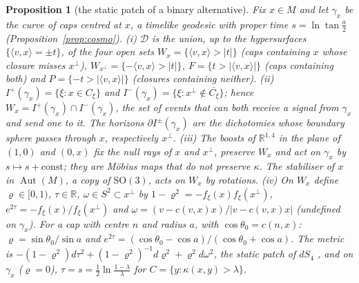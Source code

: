 \documentclass[aps,pra,onecolumn,superscriptaddress,nofootinbib,10pt]{revtex4-2}
\newtheorem{proposition}[theorem]{Proposition}
\theoremstyle{definition}
\theoremstyle{remark}
\newcommand{\R}{\mathbb{R}}
\newcommand{\cD}{\mathcal{D}}
\newcommand{\Aut}{\operatorname{Aut}}
\newcommand{\ip}[2]{\langle #1,#2\rangle}
\newcommand{\SO}{\mathrm{SO}}
\begin{document}
\begin{proposition}[the static patch of a binary alternative]\label{prop:static}
Fix $x\in M$ and let $\gamma_x$ be the curve of caps centred at $x$, a timelike geodesic with proper time
$s=\ln\tan\frac a2$ (Proposition~\ref{prop:cosmo}).
(i) $\cD$ is the union, up to the hypersurfaces $\{\ip vx=\pm t\}$, of the four open sets
$W_x=\{\ip vx>\lvert t\rvert\}$ (caps containing $x$ whose closure misses $x^\perp$),
$W_{x^\perp}=\{-\ip vx>\lvert t\rvert\}$, $F=\{t>\lvert\ip vx\rvert\}$ (caps containing both) and
$P=\{-t>\lvert\ip vx\rvert\}$ (closures containing neither).
(ii) $I^+(\gamma_x)=\{\xi:x\in C_\xi\}$ and $I^-(\gamma_x)=\{\xi:x^\perp\notin\overline{C_\xi}\}$; hence
$W_x=I^+(\gamma_x)\cap I^-(\gamma_x)$, the set of events that can both receive a signal from $\gamma_x$ and
send one to it.  The horizons $\partial I^\pm(\gamma_x)$ are the dichotomies whose boundary sphere passes
through $x$, respectively $x^\perp$.
(iii) The boosts of $\R^{1,4}$ in the plane of $(1,0)$ and $(0,x)$ fix the null rays of $x$ and $x^\perp$,
preserve $W_x$ and act on $\gamma_x$ by $s\mapsto s+\mathrm{const}$; they are M\"obius maps that do not
preserve $\kappa$.  The stabiliser of $x$ in $\Aut(M)$, a copy of $\SO(3)$, acts on $W_x$ by rotations.
(iv) On $W_x$ define $\varrho\in[0,1)$, $\tau\in\R$, $\omega\in S^2\subset x^\perp$ by
$1-\varrho^2=-f_\xi(x)f_\xi(x^\perp)$, $e^{2\tau}=-f_\xi(x)/f_\xi(x^\perp)$ and
$\omega=(v-c(v,x)x)/\lvert v-c(v,x)x\rvert$ (undefined on $\gamma_x$).  For a cap with centre $n$ and radius $a$, with
$\cos\theta_0=c(n,x)$: $\varrho=\sin\theta_0/\sin a$ and $e^{2\tau}=(\cos\theta_0-\cos a)/(\cos\theta_0+\cos a)$.
The metric is $-(1-\varrho^2)d\tau^2+(1-\varrho^2)^{-1}d\varrho^2+\varrho^2d\omega^2$, the static patch of
$dS_4$ \cite{GibbonsHawking}, and on $\gamma_x$ ($\varrho=0$), $\tau=s=\tfrac12\ln\frac{1-\lambda}\lambda$ for
$C=\{y:\kappa(x,y)>\lambda\}$.
\end{proposition}
\end{document}
